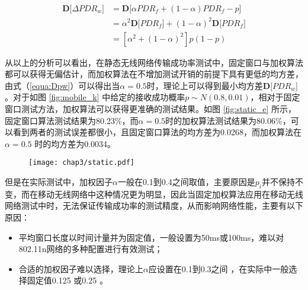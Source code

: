 \begin{equation}
\begin{split}
 \textbf{D[}\Delta PDR_w\textbf{]}&=\textbf{D[}\alpha PDR_f+(1-\alpha)PDR_f-p\textbf{]}\\
         &=\alpha^2\textbf{D[}PDR_f\textbf{]}+(1-\alpha)^2\textbf{D[}PDR_f\textbf{]}\\
         &=[\alpha^2+(1-\alpha)^2]p(1-p)
\end{split}
\label{equa:Dpw}
\end{equation}

从以上的分析可以看出，在静态无线网络传输成功率测试中，固定窗口与加权算法都可以获得无偏估计，而加权算法在不增加测试开销的前提下具有更低的均方差，由式（\ref{equa:Dpw}）可以得出当$\alpha=0.5$时，理论上可以得到最小均方差$\textbf{D[}PDR_w\textbf{]}$。对于如图 \ref{fig:mobile_k} 中给定的接收成功概率$p\sim N(0.8, 0.01)$，相对于固定窗口测试方法，加权算法可以获得更准确的测试结果。如图 \ref{fig:static_e} 所示，固定窗口算法测试结果为80.23\%，而$\alpha=0.5$时的加权算法测试结果为80.06\%，可以看到两者的测试误差都很小，且固定窗口算法的均方差为0.0268，而加权算法在$\alpha=0.5$ 时的均方差为0.0034。

\begin{figure}[!htp]
\centering
{}
    \hspace{1cm}
\end{figure}

\begin{figure}[!htp]
\centering
\texttt{[image: chap3/static.pdf]}
\end{figure}

但是在实际测试中，加权因子$\alpha$一般在0.1到0.4之间取值，主要原因是$p_i$并不保持不变，而在移动无线网络中这种情况更为明显，因此当固定加权算法应用在移动无线网络测试中时，无法保证传输成功率的测试精度，从而影响网络性能，主要有以下原因：

\begin{itemize}
  \item 平均窗口长度以时间计量并为固定值，一般设置为50ms或100ms，难以对802.11n网络的多种配置进行有效测试；
  \item 合适的加权因子难以选择，理论上$\alpha$应设置在0.1到0.3之间 \cite{EWMAChart}，在实际中一般选择固定值0.125 \cite{ath9k}或0.25 \cite{minstrel}。
\end{itemize}

